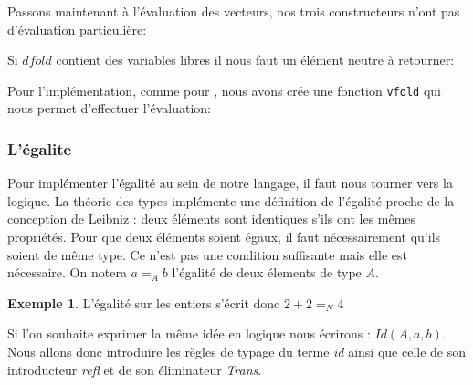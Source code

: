 \documentclass {article}
\newcommand{\codefrom}[3]
           {}
\theoremstyle{definition}
\newtheorem{example}{Exemple}
\theoremstyle{remark}
\newcommand{\fun}[1]{\lstinline!#1!}
\begin{document}
Passons maintenant à l'évaluation des vecteurs, nos trois constructeurs 
n'ont pas d'évaluation particulière:
\codefrom{dependent}{lambda}{big_step_vec}

Si $dfold$ contient des variables libres il nous faut un élément neutre à retourner:
%
\codefrom{dependent}{lambda}{neutral_fold}

Pour l'implémentation, comme pour \iter, nous avons crée une fonction \fun{vfold}
qui nous permet d'effectuer l'évaluation:

\codefrom{dependent}{lambda}{vfold}


\subsubsection{L'égalite} 
\label{egalite}

\newcommand{\equal}[3]{\ensuremath{#1 =_#2 #3}} 

Pour implémenter l'égalité au sein de notre langage, il faut nous tourner vers la logique. 
La théorie des types implémente une définition de l'égalité proche de la conception de Leibniz : deux éléments sont identiques s'ils ont les mêmes propriétés.
Pour que deux éléments soient égaux, il faut nécessairement qu'ils soient de même type. Ce n'est pas une
condition suffisante mais elle est nécessaire. On notera \equal{a}{A}{b} l'égalité de deux élements de type $A$.
\begin{example}
  L'égalité sur les entiers s'écrit donc \equal{2 + 2}{N}{4}
\end{example}

Si l'on souhaite exprimer la même idée en logique nous écrirons : $Id(A,a,b)$.
Nous allons donc introduire les règles de typage du terme \emph{id} ainsi que celle de son introducteur \emph{refl} 
et de son éliminateur \emph{Trans}.
\end{document}
